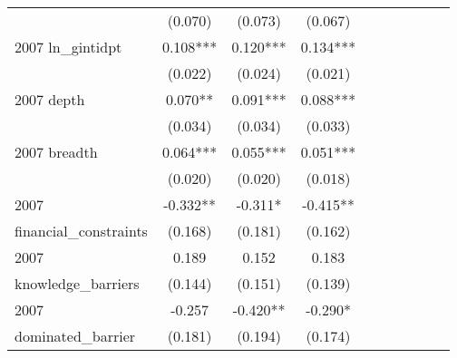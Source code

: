 \begin{table}[htbp]
\begin{tabular}{l*{9}{c}}
                    &     (0.070)   &     (0.073)   &     (0.067)   &               &               &               &               &               &               \\
2007 ln\_gintidpt    &       0.108***&       0.120***&       0.134***&               &               &               &               &               &               \\
                    &     (0.022)   &     (0.024)   &     (0.021)   &               &               &               &               &               &               \\
2007 depth          &       0.070** &       0.091***&       0.088***&               &               &               &               &               &               \\
                    &     (0.034)   &     (0.034)   &     (0.033)   &               &               &               &               &               &               \\
2007 breadth        &       0.064***&       0.055***&       0.051***&               &               &               &               &               &               \\
                    &     (0.020)   &     (0.020)   &     (0.018)   &               &               &               &               &               &               \\
2007                &      -0.332** &      -0.311*  &      -0.415** &               &               &               &               &               &               \\
financial\_constraints&     (0.168)   &     (0.181)   &     (0.162)   &               &               &               &               &               &               \\
2007                &       0.189   &       0.152   &       0.183   &               &               &               &               &               &               \\
knowledge\_barriers  &     (0.144)   &     (0.151)   &     (0.139)   &               &               &               &               &               &               \\
2007                &      -0.257   &      -0.420** &      -0.290*  &               &               &               &               &               &               \\
dominated\_barrier   &     (0.181)   &     (0.194)   &     (0.174)   &               &               &               &               &               &               \\

\end{tabular}
\end{table}
